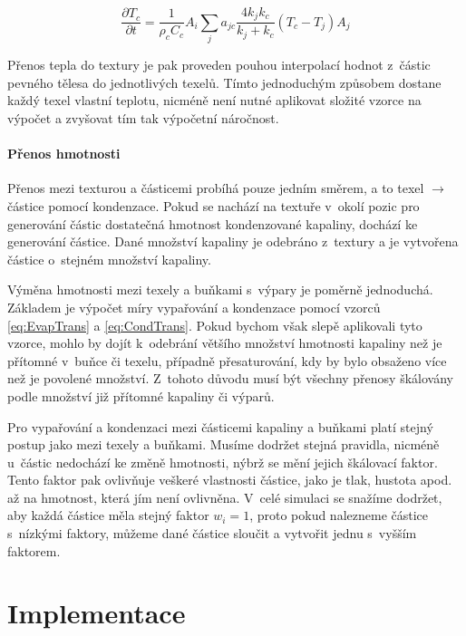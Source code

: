 \begin{equation}
    \frac{\partial T_c}{\partial t} = \frac{1}{\rho_c C_c} A_i \sum_j a_{jc}\frac{4 k_j k_c}{k_j + k_c}(T_c - T_j)A_j
    \label{eq:Cell2Part}
\end{equation}

Přenos tepla do textury je pak proveden pouhou interpolací hodnot z~částic pevného tělesa do jednotlivých texelů. Tímto jednoduchým způsobem dostane každý texel vlastní teplotu, nicméně není nutné aplikovat složité vzorce na výpočet a zvyšovat tím tak výpočetní náročnost.

\subsubsection{Přenos hmotnosti}
Přenos mezi texturou a částicemi probíhá pouze jedním směrem, a to texel $\rightarrow$ částice pomocí kondenzace. Pokud se nachází na textuře v~okolí pozic pro generování částic dostatečná hmotnost kondenzované kapaliny, dochází ke generování částice. Dané množství kapaliny je odebráno z~textury a je vytvořena částice o~stejném množství kapaliny.

Výměna hmotnosti mezi texely a buňkami s~výpary je poměrně jednoduchá. Základem je výpočet míry vypařování a kondenzace pomocí vzorců \ref{eq:EvapTrans} a \ref{eq:CondTrans}. Pokud bychom však slepě aplikovali tyto vzorce, mohlo by dojít k~odebrání většího množství hmotnosti kapaliny než je přítomné v~buňce či texelu, případně přesaturování, kdy by bylo obsaženo více než je povolené množství. Z~tohoto důvodu musí být všechny přenosy škálovány podle množství již přítomné kapaliny či výparů.

Pro vypařování a kondenzaci mezi částicemi kapaliny a buňkami platí stejný postup jako mezi texely a buňkami. Musíme dodržet stejná pravidla, nicméně u~částic nedochází ke změně hmotnosti, nýbrž se mění jejich škálovací faktor. Tento faktor pak ovlivňuje veškeré vlastnosti částice, jako je tlak, hustota apod. až na hmotnost, která jím není ovlivněna. V~celé simulaci se snažíme dodržet, aby každá částice měla stejný faktor $w_i = 1$, proto pokud nalezneme částice s~nízkými faktory, můžeme dané částice sloučit a vytvořit jednu s~vyšším faktorem. 




\chapter{Implementace}
\label{chapter:implementace}
